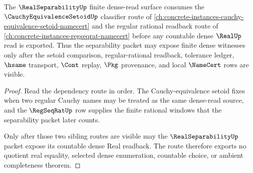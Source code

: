 \begin{theorem}
\label{thm:real-separability-cauchy-setoid-dependency}
The $\RealSeparabilityUp$ finite dense-read surface consumes the $\CauchyEquivalenceSetoidUp$ classifier route of \autoref{ch:concrete-instances-cauchy-equivalence-setoid-namecert} and the regular rational readback route of \autoref{ch:concrete-instances-regseqrat-namecert} before any countable dense $\RealUp$ read is exported. Thus the separability packet may expose finite dense witnesses only after the setoid comparison, regular-rational readback, tolerance ledger, $\hsame$ transport, $\Cont$ replay, $\Pkg$ provenance, and local $\NameCert$ rows are visible.
\end{theorem}
\begin{proof}
Read the dependency route in order. The Cauchy-equivalence setoid fixes when two regular Cauchy names may be treated as the same dense-read source, and the $\RegSeqRatUp$ row supplies the finite rational windows that the separability packet later counts.

Only after those two sibling routes are visible may the $\RealSeparabilityUp$ packet expose its countable dense Real readback. The route therefore exports no quotient real equality, selected dense enumeration, countable choice, or ambient completeness theorem.
\end{proof}
